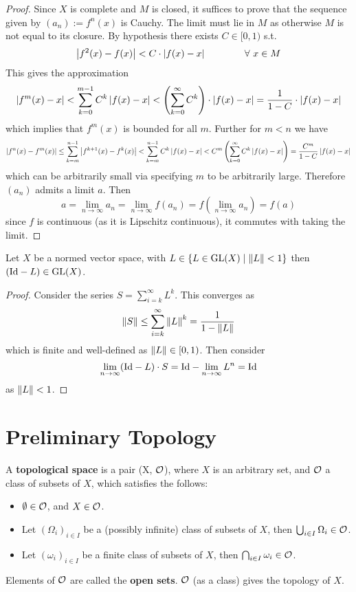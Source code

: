 \documentclass{article}
\begin{document}
\begin{proof}
    Since $X$ is complete and $M$ is closed, it suffices to prove that the sequence given by $(a_n) := f^n(x)$ is Cauchy. The limit must lie in $M$ as otherwise $M$ is not equal to its closure. By hypothesis there exists $C \in [0, 1)$ s.t.
    \[
        \left|f^2(x) - f(x)\right| < C \cdot \left|f(x) - x\right| \qquad \qquad \forall \ x \in M
    \]
    This gives the approximation
    \[
        \left|f^m(x) - x\right| < \sum_{k=0}^{m-1} C^k \left|f(x) - x\right| < \left( \sum_{k=0}^{\infty} C^k \right) \cdot \left|f(x) - x\right| = \frac{1}{1 - C} \cdot \left|f(x) - x\right|
    \]
    which implies that $f^m(x)$ is bounded for all $m$. Further for $m < n$ we have
    \[
        \left|f^n(x) - f^m(x)\right| \leq \sum_{k=m}^{n-1} \left|f^{k+1}(x) - f^k(x)\right| < \sum_{k=m}^{n-1} C^k \left|f(x) - x\right| < C^m \left(\sum_{k=0}^{\infty} C^k \left|f(x) - x\right|\right) = \frac{C^m}{1 - C}\left|f(x) - x\right|
    \]
    which can be arbitrarily small via specifying $m$ to be arbitrarily large. Therefore $(a_n)$ admits a limit $a$. Then 
    \[
        a = \lim_{n \to \infty} a_n = \lim_{n \to \infty} f(a_n) = f(\lim_{n \to \infty} a_n) = f(a)
    \]
    since $f$ is continuous (as it is Lipschitz continuous), it commutes with taking the limit.
\end{proof}

\begin{lemma}
    Let $X$ be a normed vector space, with $L \in \{L \in \mathrm{GL}(X) \mid \left\|L\right\| < 1\}$ then $(\mathrm{Id} - L) \in \mathrm{GL}(X)$. 
\end{lemma}

\begin{proof}
    Consider the series $S = \sum_{i=k}^{\infty} L^k$. This converges as
    \[
        \left\|S\right\| \leq \sum_{i=k}^{\infty} \left\|L\right\|^k = \frac{1}{1 - \left\|L\right\|}
    \]
    which is finite and well-defined as $\left\|L\right\| \in [0, 1)$. Then consider
    \[
        \lim_{n \to \infty}(\mathrm{Id} - L)\cdot S = \mathrm{Id} - \lim_{n \to \infty} L^n = \mathrm{Id}
    \]
    as $\left\|L\right\| < 1$. 
\end{proof}

\section{Preliminary Topology}

\begin{definition}
    A \textbf{topological space} is a pair (X, $\mathcal{O}$), where $X$ is an arbitrary set, and $\mathcal{O}$ a class of subsets of $X$, which satisfies the follows:
    \begin{itemize}
        \item $\emptyset \in \mathcal{O}$, and $X \in \mathcal{O}$.
        \item Let $(\Omega_i)_{i \in I}$ be a (possibly infinite) class of subsets of $X$, then $\bigcup_{i \in I} \Omega_i \in \mathcal{O}$.
        \item Let $(\omega_i)_{i \in I}$ be a finite class of subsets of $X$, then $\bigcap_{i \in I} \omega_i \in \mathcal{O}$.
    \end{itemize}
    Elements of $\mathcal{O}$ are called the \textbf{open sets}. $\mathcal{O}$ (as a class) gives the topology of $X$. 
\end{definition}
\end{document}
